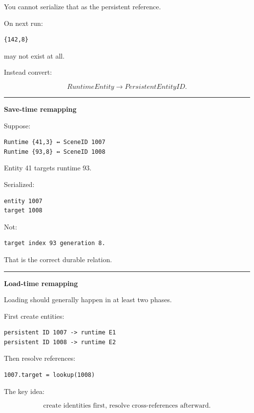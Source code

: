 You cannot serialize that as the persistent reference.

On next run:

\begin{verbatim}
{142,8}
\end{verbatim}

may not exist at all.

Instead convert:

\[
RuntimeEntity
\rightarrow
PersistentEntityID.
\]

\begin{center}\rule{0.5\linewidth}{0.5pt}\end{center}

\textbf{Save-time remapping}

Suppose:

\begin{verbatim}
Runtime {41,3} ↔ SceneID 1007
Runtime {93,8} ↔ SceneID 1008
\end{verbatim}

Entity 41 targets runtime 93.

Serialized:

\begin{verbatim}
entity 1007
target 1008
\end{verbatim}

Not:

\begin{verbatim}
target index 93 generation 8.
\end{verbatim}

That is the correct durable relation.

\begin{center}\rule{0.5\linewidth}{0.5pt}\end{center}

\textbf{Load-time remapping}

Loading should generally happen in at least two phases.

First create entities:

\begin{verbatim}
persistent ID 1007 -> runtime E1
persistent ID 1008 -> runtime E2
\end{verbatim}

Then resolve references:

\begin{verbatim}
1007.target = lookup(1008)
\end{verbatim}

The key idea:

\[
\boxed{
\text{create identities first,
resolve cross-references afterward}.
}
\]

